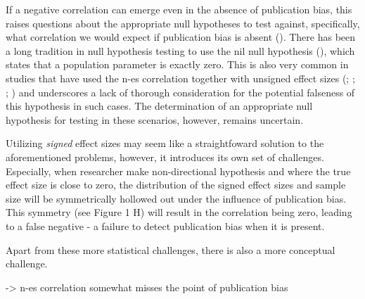 \documentclass[
  12pt,
]{scrartcl}
\begin{document}
If a negative correlation can emerge even in the absence of publication
bias, this raises questions about the appropriate null hypotheses to
test against, specifically, what correlation we would expect if
publication bias is absent (). There has been a long tradition in null
hypothesis testing to use the nil null hypothesis
(), which states that a
population parameter is exactly zero. This is also very common in
studies that have used the n-es correlation together with unsigned
effect sizes (; ;
;
) and
underscores a lack of thorough consideration for the potential falseness
of this hypothesis in such cases. The determination of an appropriate
null hypothesis for testing in these scenarios, however, remains
uncertain.

Utilizing \emph{signed} effect sizes may seem like a straightfoward
solution to the aforementioned problems, however, it introduces its own
set of challenges. Especially, when researcher make non-directional
hypothesis and where the true effect size is close to zero, the
distribution of the signed effect sizes and sample size will be
symmetrically hollowed out under the influence of publication bias. This
symmetry (see Figure 1 H) will result in the correlation being zero,
leading to a false negative - a failure to detect publication bias when
it is present.

Apart from these more statistical challenges, there is also a more
conceptual challenge.

-\textgreater{} n-es correlation somewhat misses the point of
publication bias
\end{document}
